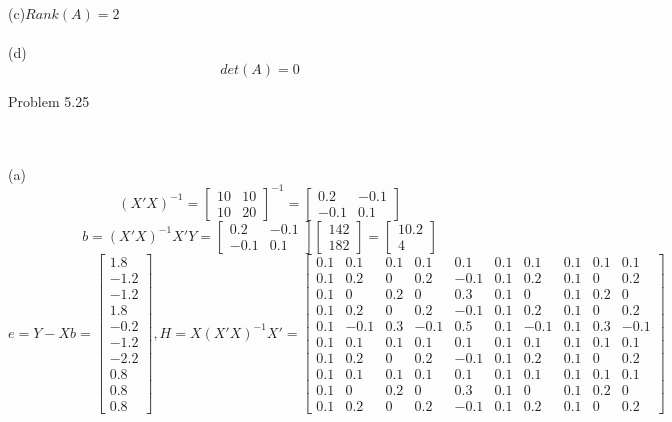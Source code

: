 \documentclass{article}
\begin{document}
\\\\(c)$Rank(A)=2$
\\\\(d)\[det(A)=0\]
\begin{large}Problem 5.25\end{large}
\\\\(a)\[(X'X)^{-1}=\begin{bmatrix}10&10\\10&20\end{bmatrix}^{-1}=\begin{bmatrix}0.2&-0.1\\-0.1&0.1\end{bmatrix}\]
\[b=(X'X)^{-1}X'Y=\begin{bmatrix}0.2&-0.1\\-0.1&0.1\end{bmatrix}\begin{bmatrix}142\\182\end{bmatrix}=\begin{bmatrix}10.2\\4\end{bmatrix}\]
\[e=Y-Xb=\begin{bmatrix}1.8\\ -1.2\\ -1.2\\ 1.8\\ -0.2\\ -1.2\\ -2.2\\ 0.8\\ 0.8\\ 0.8
\end{bmatrix},H=X(X'X)^{-1}X'=\begin{bmatrix}0.1 & 0.1 & 0.1 & 0.1 & 0.1 & 0.1 & 0.1 & 0.1 & 0.1 & 0.1\\ 0.1 & 0.2 & 0 & 0.2 & -0.1 & 0.1 & 0.2 & 0.1 & 0 & 0.2\\ 0.1 & 0 & 0.2 & 0 & 0.3 & 0.1 & 0 & 0.1 & 0.2 & 0\\ 0.1 & 0.2 & 0 & 0.2 & -0.1 & 0.1 & 0.2 & 0.1 & 0 & 0.2\\ 0.1 & -0.1 & 0.3 & -0.1 & 0.5 & 0.1 & -0.1 & 0.1 & 0.3 & -0.1\\ 0.1 & 0.1 & 0.1 & 0.1 & 0.1 & 0.1 & 0.1 & 0.1 & 0.1 & 0.1\\ 0.1 & 0.2 & 0 & 0.2 & -0.1 & 0.1 & 0.2 & 0.1 & 0 & 0.2\\ 0.1 & 0.1 & 0.1 & 0.1 & 0.1 & 0.1 & 0.1 & 0.1 & 0.1 & 0.1\\ 0.1 & 0 & 0.2 & 0 & 0.3 & 0.1 & 0 & 0.1 & 0.2 & 0\\ 0.1 & 0.2 & 0 & 0.2 & -0.1 & 0.1 & 0.2 & 0.1 & 0 & 0.2\end{bmatrix}
\]
\end{document}
